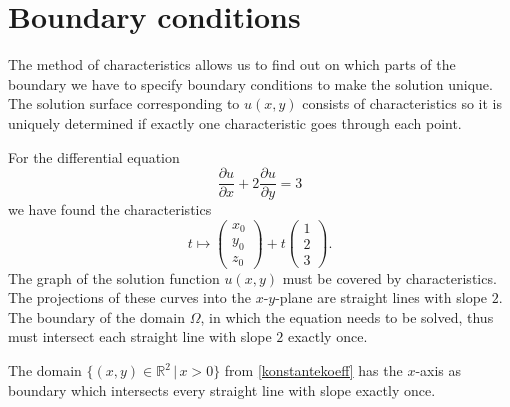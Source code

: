 %
%
%
\section{Boundary conditions}
The method of characteristics allows us to find out on which parts of the
boundary we have to specify boundary conditions to make the solution
unique.
The solution surface corresponding to $u(x,y)$ consists of characteristics
so it is uniquely determined if exactly one characteristic goes through
each point.

For the differential equation
\begin{equation}
\frac{\partial u}{\partial x}+2\frac{\partial u}{\partial y}=3
\label{geometrie:knickbeispiel}
\end{equation}
we have found the characteristics
\[
t\mapsto\begin{pmatrix}x_0\\y_0\\z_0\end{pmatrix}+t\begin{pmatrix}1\\2\\3\end{pmatrix}.
\]
The graph of the solution function $u(x,y)$ must be covered by characteristics.
The projections of these curves into the $x$-$y$-plane are straight lines
with slope $2$.
The boundary of the domain $\Omega$, in which the equation needs to be
solved, thus must intersect each straight line with slope $2$ exactly once.

The domain
$\{(x,y)\in\mathbb R^2\,|\, x >0\}$  from \ref{konstantekoeff}
has the $x$-axis as boundary which intersects every straight line with
slope exactly once.

